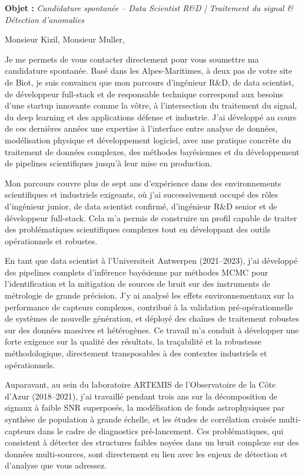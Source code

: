 \documentclass[11pt,a4paper]{altacv}
\begin{document}
\makecvheader


{\color{accent}\textbf{Objet :}} \textit{Candidature spontanée -- Data Scientist R\&D | Traitement du signal \& Détection d'anomalies}

{\color{body}

Monsieur Kizil, Monsieur Muller,

Je me permets de vous contacter directement pour vous soumettre ma candidature spontanée. Basé dans les Alpes-Maritimes, à deux pas de votre site de Biot, je suis convaincu que mon parcours d’ingénieur R\&D, de data scientist, de développeur full-stack et de responsable technique correspond aux besoins d’une startup innovante comme la vôtre, à l’intersection du traitement du signal, du deep learning et des applications défense et industrie. J’ai développé au cours de ces dernières années une expertise à l’interface entre analyse de données, modélisation physique et développement logiciel, avec une pratique concrète du traitement de données complexes, des méthodes bayésiennes et du développement de pipelines scientifiques jusqu’à leur mise en production.

Mon parcours couvre plus de sept ans d’expérience dans des environnements scientifiques et industriels exigeants, où j’ai successivement occupé des rôles d’ingénieur junior, de data scientist confirmé, d’ingénieur R\&D senior et de développeur full-stack. Cela m’a permis de construire un profil capable de traiter des problématiques scientifiques complexes tout en développant des outils opérationnels et robustes.

En tant que data scientist à l’Universiteit Antwerpen (2021--2023), j’ai développé des pipelines complets d’inférence bayésienne par méthodes MCMC pour l’identification et la mitigation de sources de bruit sur des instruments de métrologie de grande précision. J’y ai analysé les effets environnementaux sur la performance de capteurs complexes, contribué à la validation pré-opérationnelle de systèmes de nouvelle génération, et déployé des chaînes de traitement robustes sur des données massives et hétérogènes. Ce travail m’a conduit à développer une forte exigence sur la qualité des résultats, la traçabilité et la robustesse méthodologique, directement transposables à des contextes industriels et opérationnels.

Auparavant, au sein du laboratoire ARTEMIS de l’Observatoire de la Côte d’Azur (2018--2021), j’ai travaillé pendant trois ans sur la décomposition de signaux à faible SNR superposés, la modélisation de fonds astrophysiques par synthèse de population à grande échelle, et les études de corrélation croisée multi-capteurs dans le cadre de diagnostics pré-lancement. Ces problématiques, qui consistent à détecter des structures faibles noyées dans un bruit complexe sur des données multi-sources, sont directement en lien avec les enjeux de détection et d’analyse que vous adressez.

}
\end{document}
